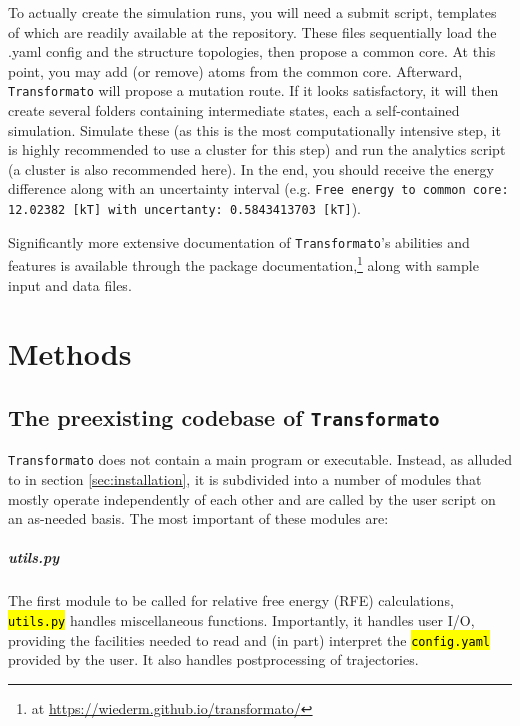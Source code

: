 \documentclass[oneside]{scrreprt}
\newcommand{\code}[1]{\texttt{\hl{#1}}}
\begin{document}
To actually create the simulation runs, you will need a submit script, templates of which are readily available at the repository. These files sequentially load the .yaml config and the structure topologies, then propose a common core. At this point, you may add (or remove) atoms from the common core. Afterward, \texttt{Transformato} will propose a mutation route. If it looks satisfactory, it will then create several folders containing intermediate states, each a self-contained simulation. Simulate these (as this is the most computationally intensive step, it is highly recommended to use a cluster for this step) and run the analytics script (a cluster is also recommended here). In the end, you should receive the energy difference along with an uncertainty interval (e.g. \texttt{Free energy to common core: 12.02382 [kT] with uncertanty: 0.5843413703 [kT]}).
    

Significantly more extensive documentation of \texttt{Transformato}'s abilities and features is available through the package documentation,\footnote{at \url{https://wiederm.github.io/transformato/}} along with sample input and data files.


\chapter{Methods}
\section{The preexisting codebase of \texttt{Transformato}}
\texttt{Transformato} does not contain a main program or executable. Instead, as alluded to in section \ref{sec:installation}, it is subdivided into a number of modules that mostly operate independently of each other and are called by the user script on an as-needed basis. The most important of these modules are:
\paragraph{utils.py}
The first module to be called for relative free energy (RFE) calculations, \code{utils.py} handles miscellaneous functions. Importantly, it handles user I/O, providing the facilities needed to read and (in part) interpret the \code{config.yaml} provided by the user. It also handles postprocessing of trajectories.
\end{document}
